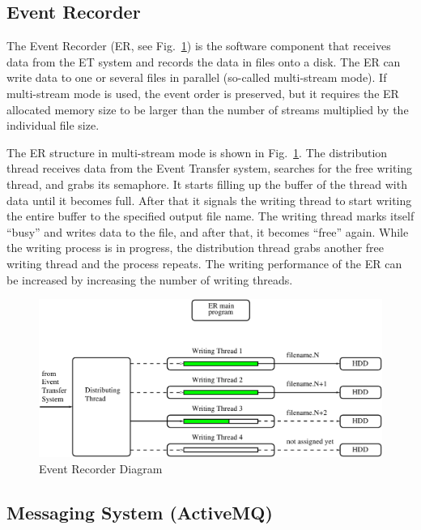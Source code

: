 \subsection{Event Recorder}

The Event Recorder (ER, see Fig.~\ref{fig:er_diagram}) is the software component that receives data from the ET system and records the data in files onto a disk. The ER can write data to one or several files in parallel (so-called multi-stream mode). If multi-stream mode is used, the event order is preserved, but it requires the ER allocated memory size to be larger than the number of streams multiplied by the individual file size.

The ER structure in multi-stream mode is shown in Fig.~\ref{fig:er_diagram}. The distribution thread receives data from the Event Transfer system, searches for the free writing thread, and grabs its semaphore. It starts filling up the buffer of the thread with data until it becomes full. After that it signals the writing thread to start writing the entire buffer to the specified output file name. The writing thread marks itself ``busy'' and writes data to the file, and after that, it becomes ``free'' again. While the writing process is in progress, the distribution thread grabs another free writing thread and the process repeats. The writing performance of the ER can be increased by increasing the number of writing threads.

\begin{figure}[hbt]
	\centering
	\includegraphics[width=1.0\columnwidth,keepaspectratio]{img/er_diagram.pdf}
	\caption{Event Recorder Diagram}
	\label{fig:er_diagram}
\end{figure}


\subsection{Messaging System (ActiveMQ)}

